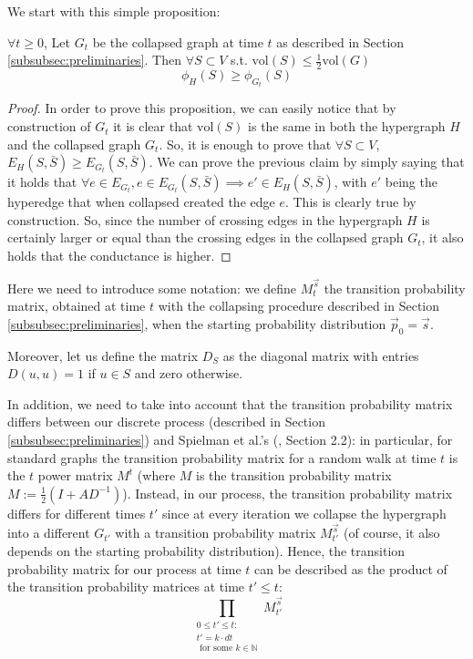 \documentclass[../main.tex]{subfiles}
\begin{document}
    We start with this simple proposition:
    
    \begin{proposition}
    \label{prop:conductance_hypergraph_gte_collapsed_graph}
        $\forall t \geq 0$, Let $G_t$ be the collapsed graph at time $t$ as described in Section \ref{subsubsec:preliminaries}. Then $\forall S\subset V$ s.t. $\text{vol}(S) \leq \frac{1}{2}\text{vol}(G)$
        \begin{equation}
            \phi_H(S) \geq \phi_{G_t}(S)
        \end{equation}
    \end{proposition}
    \begin{proof}
        In order to prove this proposition, we can easily notice that by construction of $G_t$ it is clear that $\text{vol}(S)$ is the same in both the hypergraph $H$ and the collapsed graph $G_t$. So, it is enough to prove that $\forall S\subset V$,  $E_H(S,\bar{S}) \geq E_{G_t}(S,\bar{S})$. We can prove the previous claim by simply saying that it holds that $\forall e\in E_{G_t}, e\in E_{G_t}(S, \bar{S}) \implies e' \in E_H(S, \bar{S})$, with $e'$ being the hyperedge that when collapsed created the edge $e$. This is clearly true by construction. So, since the number of crossing edges in the hypergraph $H$ is certainly larger or equal than the crossing edges in the collapsed graph $G_t$, it also holds that the conductance is higher.
    \end{proof}
    
    Here we need to introduce some notation: we define $M_t^{\vec{s}}$ the transition probability matrix, obtained at time $t$ with the collapsing procedure described in Section \ref{subsubsec:preliminaries}, when the starting probability distribution $\vec{p}_0 = \vec{s}$.
    
    Moreover, let us define the matrix $D_S$ as the diagonal matrix with entries $D(u,u) = 1$ if $u\in S$ and zero otherwise. 
    
    In addition, we need to take into account that the transition probability matrix differs between our discrete process (described in Section \ref{subsubsec:preliminaries}) and Spielman et al.'s (\cite{SpielmanClustering}, Section 2.2): in particular, for standard graphs the transition probability matrix for a random walk at time $t$ is the $t$ power matrix $M^t$ (where $M$ is the transition probability matrix $M:= \frac{1}{2}(I + AD^{-1})$). Instead, in our process, the transition probability matrix differs for different times $t'$ since at every iteration we collapse the hypergraph into a different $G_{t'}$ with a transition probability matrix $M_{t'}^{\vec{s}}$ (of course, it also depends on the starting probability distribution). Hence, the transition probability matrix for our process at time $t$ can be described as the product of the transition probability matrices at time $t' \leq t$: 
    \begin{equation}
        \prod_{\substack{0 \leq t' \leq t:\\ t' = k\cdot dt\\ \text{ for some }k\in \mathbb{N}}} M_{t'}^{\vec{s}}
    \end{equation}
    
\end{document}
